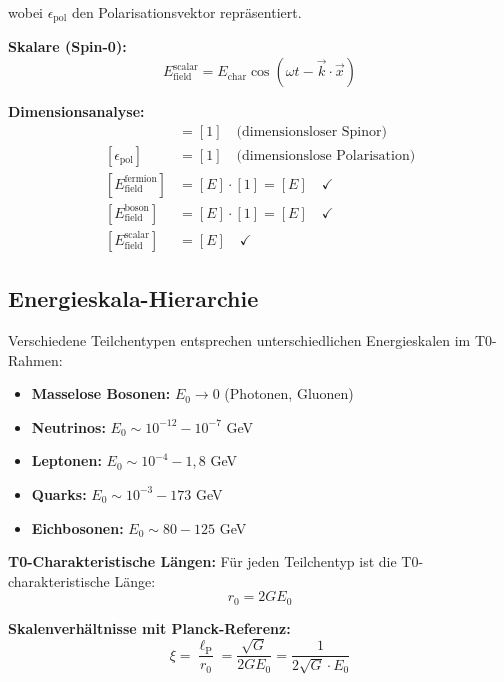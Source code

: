 \documentclass[12pt,a4paper]{report}
\newcommand{\lP}{\ell_{\text{P}}}         %
\newcommand{\rzero}{r_0}                  %
\begin{document}
	wobei $\epsilon_{\text{pol}}$ den Polarisationsvektor repräsentiert.
	
	\textbf{Skalare (Spin-0):}
	\begin{equation}
		E_{\text{field}}^{\text{scalar}} = E_{\text{char}} \cos(\omega t - \vec{k} \cdot \vec{x})
	\end{equation}
	
	\textbf{Dimensionsanalyse:}
	\begin{align}
		[\xi_{\text{spin}}] &= [1] \quad \text{(dimensionsloser Spinor)} \\
		[\epsilon_{\text{pol}}] &= [1] \quad \text{(dimensionslose Polarisation)} \\
		[E_{\text{field}}^{\text{fermion}}] &= [E] \cdot [1] = [E] \quad \checkmark \\
		[E_{\text{field}}^{\text{boson}}] &= [E] \cdot [1] = [E] \quad \checkmark \\
		[E_{\text{field}}^{\text{scalar}}] &= [E] \quad \checkmark
	\end{align}
	
	\subsection{Energieskala-Hierarchie}
	\label{subsec:energy_scale_hierarchy}
	
	Verschiedene Teilchentypen entsprechen unterschiedlichen Energieskalen im T0-Rahmen:
	
	\begin{itemize}
		\item \textbf{Masselose Bosonen:} $E_0 \rightarrow 0$ (Photonen, Gluonen)
		\item \textbf{Neutrinos:} $E_0 \sim 10^{-12} - 10^{-7}$ GeV
		\item \textbf{Leptonen:} $E_0 \sim 10^{-4} - 1,8$ GeV
		\item \textbf{Quarks:} $E_0 \sim 10^{-3} - 173$ GeV
		\item \textbf{Eichbosonen:} $E_0 \sim 80 - 125$ GeV
	\end{itemize}
	
	\textbf{T0-Charakteristische Längen:}
	Für jeden Teilchentyp ist die T0-charakteristische Länge:
	\begin{equation}
		\rzero = 2GE_0
	\end{equation}
	
	\textbf{Skalenverhältnisse mit Planck-Referenz:}
	\begin{equation}
		\xi = \frac{\lP}{\rzero} = \frac{\sqrt{G}}{2GE_0} = \frac{1}{2\sqrt{G} \cdot E_0}
	\end{equation}
	
\end{document}
